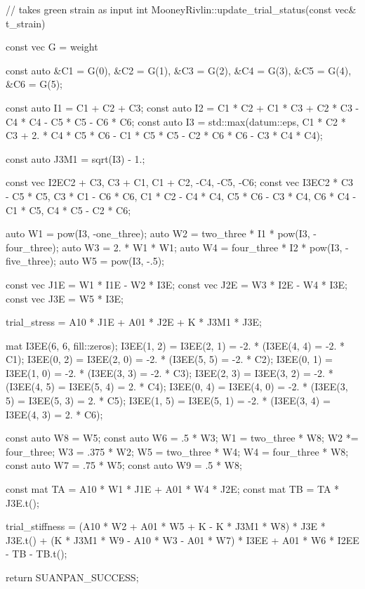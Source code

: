 \begin{cppcode}
// takes green strain as input
int MooneyRivlin::update_trial_status(const vec& t_strain) {
    const vec G = weight %

    const auto &C1 = G(0), &C2 = G(1), &C3 = G(2), &C4 = G(3), &C5 = G(4), &C6 = G(5);

    const auto I1 = C1 + C2 + C3;
    const auto I2 = C1 * C2 + C1 * C3 + C2 * C3 - C4 * C4 - C5 * C5 - C6 * C6;
    const auto I3 = std::max(datum::eps, C1 * C2 * C3 + 2. * C4 * C5 * C6 - C1 * C5 * C5 - C2 * C6 * C6 - C3 * C4 * C4);

    const auto J3M1 = sqrt(I3) - 1.;

    const vec I2E{C2 + C3, C3 + C1, C1 + C2, -C4, -C5, -C6};
    const vec I3E{C2 * C3 - C5 * C5, C3 * C1 - C6 * C6, C1 * C2 - C4 * C4, C5 * C6 - C3 * C4, C6 * C4 - C1 * C5, C4 * C5 - C2 * C6};

    auto W1 = pow(I3, -one_three);
    auto W2 = two_three * I1 * pow(I3, -four_three);
    auto W3 = 2. * W1 * W1;
    auto W4 = four_three * I2 * pow(I3, -five_three);
    auto W5 = pow(I3, -.5);

    const vec J1E = W1 * I1E - W2 * I3E;
    const vec J2E = W3 * I2E - W4 * I3E;
    const vec J3E = W5 * I3E;

    trial_stress = A10 * J1E + A01 * J2E + K * J3M1 * J3E;

    mat I3EE(6, 6, fill::zeros);
    I3EE(1, 2) = I3EE(2, 1) = -2. * (I3EE(4, 4) = -2. * C1);
    I3EE(0, 2) = I3EE(2, 0) = -2. * (I3EE(5, 5) = -2. * C2);
    I3EE(0, 1) = I3EE(1, 0) = -2. * (I3EE(3, 3) = -2. * C3);
    I3EE(2, 3) = I3EE(3, 2) = -2. * (I3EE(4, 5) = I3EE(5, 4) = 2. * C4);
    I3EE(0, 4) = I3EE(4, 0) = -2. * (I3EE(3, 5) = I3EE(5, 3) = 2. * C5);
    I3EE(1, 5) = I3EE(5, 1) = -2. * (I3EE(3, 4) = I3EE(4, 3) = 2. * C6);

    const auto W8 = W5;
    const auto W6 = .5 * W3;
    W1 = two_three * W8;
    W2 *= four_three;
    W3 = .375 * W2;
    W5 = two_three * W4;
    W4 = four_three * W8;
    const auto W7 = .75 * W5;
    const auto W9 = .5 * W8;

    const mat TA = A10 * W1 * J1E + A01 * W4 * J2E;
    const mat TB = TA * J3E.t();

    trial_stiffness = (A10 * W2 + A01 * W5 + K - K * J3M1 * W8) * J3E * J3E.t() + (K * J3M1 * W9 - A10 * W3 - A01 * W7) * I3EE + A01 * W6 * I2EE - TB - TB.t();

    return SUANPAN_SUCCESS;
}
\end{cppcode}
